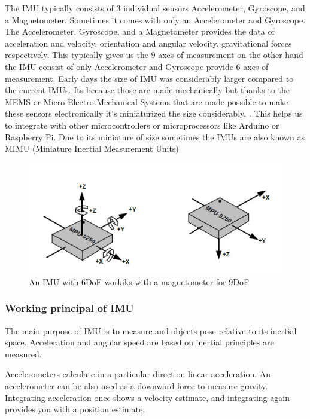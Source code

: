 The IMU typically consists of 3 individual sensors Accelerometer, Gyroscope, and a Magnetometer. Sometimes it comes with only an Accelerometer and Gyroscope. The Accelerometer, Gyroscope, and a Magnetometer provides the data of acceleration and velocity, orientation and angular velocity, gravitational forces respectively. This typically gives us the 9 axes of measurement on the other hand the IMU consist of only Accelerometer and Gyroscope provide 6 axes of measurement.
Early days the size of IMU was considerably larger compared to the current IMUs. Its because those are made mechanically but thanks to the MEMS or Micro-Electro-Mechanical Systems that are made possible to make these sensors electronically it's miniaturized the size considerably. \cite{MEMS}.
This helps us to integrate with other microcontrollers or microprocessors like Arduino or Raspberry Pi. Due to its miniature of size sometimes the IMUs are also known as MIMU (Miniature Inertial Measurement Units) \cite{2018233}

\begin{figure}[h]
  \centering
    \includegraphics[width=\linewidth]{figures/imuAG.png}
    \caption{ An IMU with 6DoF workiks with a magnetometer for 9DoF }
\label{fig:imuAG}
\end{figure}


\subsubsection{Working principal of IMU}
The main purpose of IMU is to measure and objects pose relative to its inertial space. Acceleration and angular speed are based on inertial principles are measured.

Accelerometers calculate in a particular direction linear acceleration. An accelerometer can be also used as a downward force to measure gravity. Integrating acceleration once shows a velocity estimate, and integrating again provides you with a position estimate.


